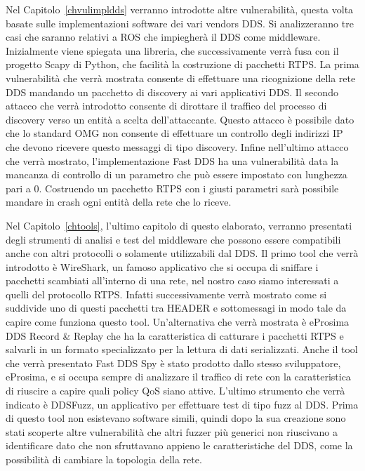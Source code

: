 Nel Capitolo~\ref{chvulimpldds} verranno introdotte altre vulnerabilità,
questa volta basate sulle implementazioni software dei vari vendors DDS. 
Si analizzeranno tre casi che saranno relativi a ROS che impiegherà 
il DDS come middleware. Inizialmente viene spiegata una libreria, che
successivamente verrà fusa con il progetto Scapy di Python, che facilità
la costruzione di pacchetti RTPS. La prima vulnerabilità che verrà 
mostrata consente di effettuare una ricognizione della rete DDS 
mandando un pacchetto di discovery ai vari applicativi DDS.
Il secondo attacco che verrà introdotto consente di dirottare il traffico 
del processo di discovery verso un entità a scelta dell'attaccante.
Questo attacco è possibile dato che lo standard OMG non consente 
di effettuare un controllo degli indirizzi IP che devono ricevere 
questo messaggi di tipo discovery.
Infine nell'ultimo attacco che verrà mostrato, l'implementazione 
Fast DDS ha una vulnerabilità data la mancanza di controllo di 
un parametro che può essere impostato con lunghezza pari a 0. 
Costruendo un pacchetto RTPS con i giusti parametri sarà possibile 
mandare in crash ogni entità della rete che lo riceve.

Nel Capitolo~\ref{chtools}, l'ultimo capitolo di questo elaborato,
verranno presentati degli strumenti di analisi e test del middleware 
che possono essere compatibili anche con altri protocolli o solamente
utilizzabili dal DDS. Il primo tool che verrà introdotto è WireShark, 
un famoso applicativo che si occupa di sniffare i pacchetti scambiati 
all'interno di una rete, nel nostro caso siamo interessati a quelli 
del protocollo RTPS. Infatti successivamente verrà mostrato come 
si suddivide uno di questi pacchetti tra HEADER e sottomessagi in 
modo tale da capire come funziona questo tool. Un'alternativa 
che verrà mostrata è eProsima DDS Record \&
Replay che ha la caratteristica di catturare i pacchetti RTPS e salvarli 
in un formato specializzato per la lettura di dati serializzati.
Anche il tool che verrà presentato Fast DDS Spy è stato prodotto 
dallo stesso sviluppatore, eProsima, e si occupa sempre di analizzare 
il traffico di rete con la caratteristica di riuscire a capire 
quali policy QoS siano attive.
L'ultimo strumento che verrà indicato è DDSFuzz, un applicativo 
per effettuare test di tipo fuzz al DDS. Prima di questo tool non 
esistevano software simili, quindi dopo la sua creazione sono stati 
scoperte altre vulnerabilità che altri fuzzer più generici non riuscivano 
a identificare dato che non sfruttavano 
appieno le caratteristiche del DDS, 
come la possibilità di cambiare la topologia della rete.